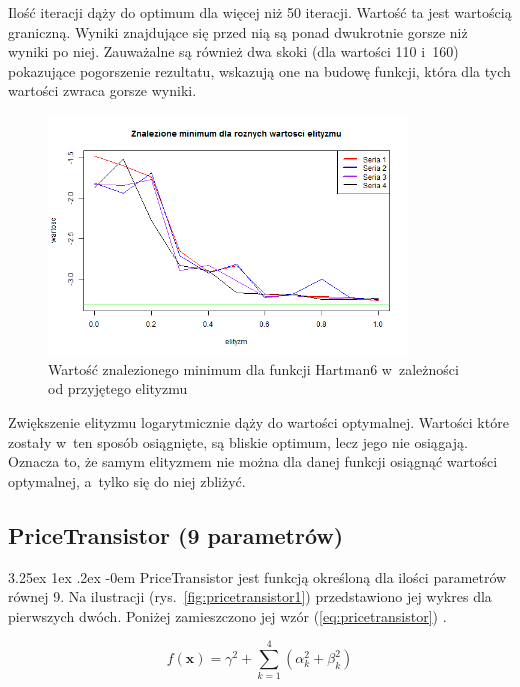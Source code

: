 \documentclass[11pt, a4paper]{article}
\makeatletter
\newcommand{\fbi}{\leavevmode{\parindent=1em\indent}}
\renewcommand\paragraph{\@startsection{paragraph}{5}{\z@}
  {3.25ex \@plus1ex \@minus.2ex}
  {-0em}
  {\normalfont\normalsize\bfseries}}
\makeatother
\begin{document}
\fbi
Ilość iteracji dąży do optimum dla więcej niż 50 iteracji. Wartość ta jest wartością graniczną. Wyniki znajdujące się przed nią są ponad dwukrotnie gorsze niż wyniki po niej. Zauważalne są również dwa skoki (dla wartości 110 i~160) pokazujące pogorszenie rezultatu, wskazują one na budowę funkcji, która dla tych wartości zwraca gorsze wyniki.

\begin{figure}[H]
	\begin{center}
		\includegraphics[width=0.85\textwidth]{./assets/Hartman66.png}
		\caption{Wartość znalezionego minimum dla funkcji Hartman6 w~zależności od przyjętego elityzmu}
		\label{fig:hartman66}
	\end{center}
\end{figure}

\fbi
Zwiększenie elityzmu logarytmicznie dąży do wartości optymalnej. Wartości które zostały w~ten sposób osiągnięte, są bliskie optimum, lecz jego nie osiągają. Oznacza to, że samym elityzmem nie można dla danej funkcji osiągnąć wartości optymalnej, a~tylko się do niej zbliżyć.

\newpage
\subsection{PriceTransistor (9 parametrów)}
\paragraph{}
PriceTransistor jest funkcją określoną dla ilości parametrów równej 9. Na ilustracji (rys.~\ref{fig:pricetransistor1}) przedstawiono jej wykres dla pierwszych dwóch. Poniżej zamieszczono jej wzór (\ref{eq:pricetransistor}) \cite{test4}.

\begin{equation}\label{eq:pricetransistor}
f(\boldsymbol{x}) = \gamma^2 + \sum_{k=1}^{4} ( \alpha_k^2 + \beta_k^2 )
\end{equation}
\end{document}
